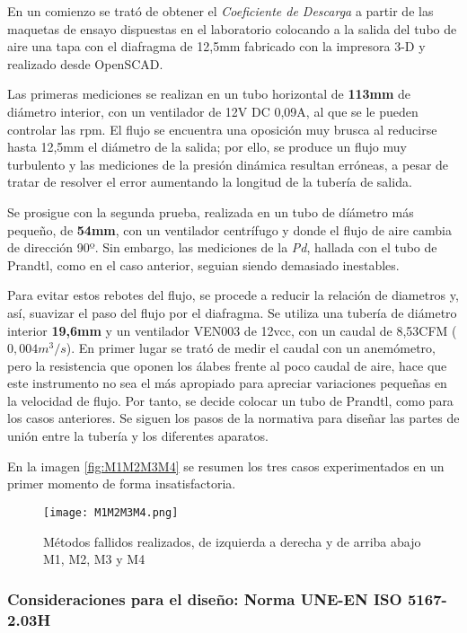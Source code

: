 En un comienzo se trató de obtener el \emph{Coeficiente de Descarga} a
partir de las maquetas de ensayo dispuestas en el laboratorio colocando
a la salida del tubo de aire una tapa con el diafragma de 12,5mm
fabricado con la impresora 3-D y realizado desde OpenSCAD.

Las primeras mediciones se realizan en un tubo horizontal de
\textbf{113mm} de diámetro interior, con un ventilador de 12V DC 0,09A,
al que se le pueden controlar las rpm. El flujo se encuentra una
oposición muy brusca al reducirse hasta 12,5mm el diámetro de la salida;
por ello, se produce un flujo muy turbulento y las mediciones de la
presión dinámica resultan erróneas, a pesar de tratar de resolver el
error aumentando la longitud de la tubería de salida.

Se prosigue con la segunda prueba, realizada en un tubo de díámetro más
pequeño, de \textbf{54mm}, con un ventilador centrífugo y donde el flujo
de aire cambia de dirección 90º. Sin embargo, las mediciones de la
\emph{Pd}, hallada con el tubo de Prandtl, como en el caso anterior,
seguian siendo demasiado inestables.

Para evitar estos rebotes del flujo, se procede a reducir la relación de
diametros y, así, suavizar el paso del flujo por el diafragma. Se
utiliza una tubería de diámetro interior \textbf{19,6mm} y un ventilador
VEN003 de 12vcc, con un caudal de 8,53CFM ($0,004m^3/s$). En primer lugar
se trató de medir el caudal con un anemómetro, pero la resistencia que
oponen los álabes frente al poco caudal de aire, hace que este
instrumento no sea el más apropiado para apreciar variaciones pequeñas
en la velocidad de flujo. Por tanto, se decide colocar un tubo de
Prandtl, como para los casos anteriores. Se siguen los pasos de la
normativa para diseñar las partes de unión entre la tubería y los
diferentes aparatos.

En la imagen \autoref{fig:M1M2M3M4} se resumen los tres casos experimentados en un primer momento de forma insatisfactoria.
\begin{figure}[hb]
\centering
\texttt{[image: M1M2M3M4.png]}
\caption[Métodos fallidos realizados]{Métodos fallidos realizados, de izquierda a derecha y de arriba abajo M1, M2, M3 y M4}
\label{fig:M1M2M3M4}
\end{figure}

\subsubsection{Consideraciones para el diseño: Norma UNE-EN ISO 5167-2.03H}\label{header-n277}

